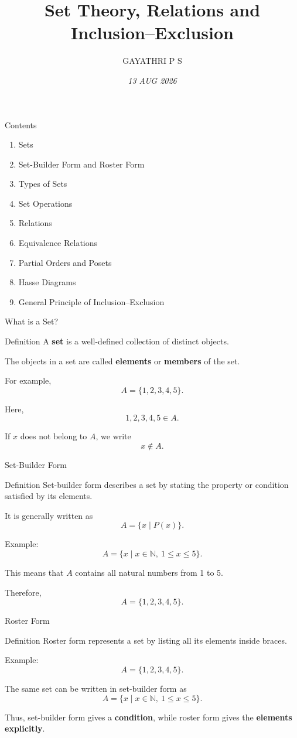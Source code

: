 \documentclass[aspectratio=169]{beamer}
\title{\textbf{Set Theory, Relations and Inclusion--Exclusion}}
\author{GAYATHRI P S}
\date{\textit{13 AUG 2026}}
\begin{document}
\begin{frame}
\titlepage
\end{frame}

\begin{frame}{Contents}
\begin{enumerate}
\item Sets
\item Set-Builder Form and Roster Form
\item Types of Sets
\item Set Operations
\item Relations
\item Equivalence Relations
\item Partial Orders and Posets
\item Hasse Diagrams
\item General Principle of Inclusion--Exclusion
\end{enumerate}
\end{frame}

\begin{frame}{What is a Set?}
\begin{block}{Definition}
A \textbf{set} is a well-defined collection of distinct objects.
\end{block}

The objects in a set are called \textbf{elements} or \textbf{members} of the set.

For example,
\[
A=\{1,2,3,4,5\}.
\]

Here,
\[
1,2,3,4,5\in A.
\]

If $x$ does not belong to $A$, we write
\[
x\notin A.
\]
\end{frame}

\begin{frame}{Set-Builder Form}
\begin{block}{Definition}
Set-builder form describes a set by stating the property or condition satisfied by its elements.
\end{block}

It is generally written as
\[
A=\{x\mid P(x)\}.
\]

Example:
\[
A=\{x\mid x\in\mathbb{N},\ 1\leq x\leq5\}.
\]

This means that $A$ contains all natural numbers from 1 to 5.

Therefore,
\[
A=\{1,2,3,4,5\}.
\]
\end{frame}

\begin{frame}{Roster Form}
\begin{block}{Definition}
Roster form represents a set by listing all its elements inside braces.
\end{block}

Example:
\[
A=\{1,2,3,4,5\}.
\]

The same set can be written in set-builder form as
\[
A=\{x\mid x\in\mathbb{N},\ 1\leq x\leq5\}.
\]

Thus, set-builder form gives a \textbf{condition}, while roster form gives the \textbf{elements explicitly}.
\end{frame}
\end{document}
